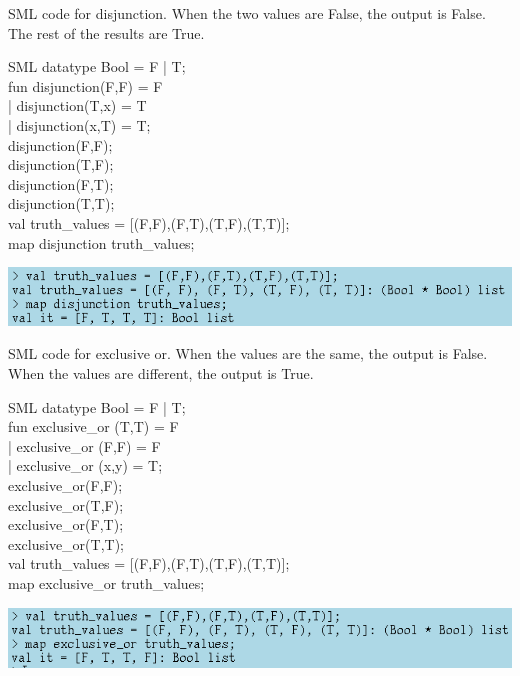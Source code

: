 \documentclass[11pt]{article}
\begin{document}
SML code for disjunction. When the two values are False, the output is False. The rest of the results are True.
\begin{GFT}{SML}
\+datatype Bool = F | T;\\
\+fun disjunction(F,F) = F\\
\+| disjunction(T,x) = T\\
\+| disjunction(x,T) = T;\\
\+disjunction(F,F);\\
\+disjunction(T,F);\\
\+disjunction(F,T);\\
\+disjunction(T,T);\\
\+val truth\_values = [(F,F),(F,T),(T,F),(T,T)];\\
\+map disjunction truth\_values;\\
\end{GFT}
\includegraphics[scale=0.6]{dis.png}
\clearpage

SML code for exclusive or. When the values are the same, the output is False. When the values are different, the output is True.\\
\begin{GFT}{SML}
\+datatype Bool = F | T;\\
\+fun exclusive\_or (T,T) = F\\
\+ | exclusive\_or (F,F) = F\\
\+ | exclusive\_or (x,y) = T;\\
\+exclusive\_or(F,F);\\
\+exclusive\_or(T,F);\\
\+exclusive\_or(F,T);\\
\+exclusive\_or(T,T);\\
\+val truth\_values = [(F,F),(F,T),(T,F),(T,T)];\\
\+map exclusive\_or truth\_values;\\
\end{GFT}
\includegraphics[scale=0.6]{xor.png}
\clearpage
\end{document}
